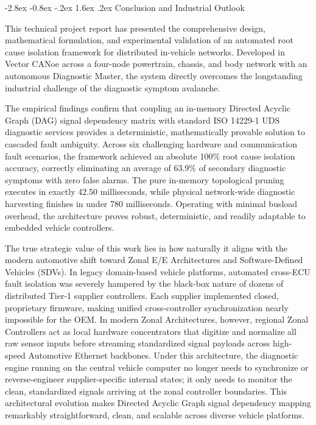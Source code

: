 \documentclass[11pt,a4paper]{article}
\makeatletter
\renewcommand{\section}{\@startsection{section}{1}{\z@}%
  {-2.8ex \@plus -0.8ex \@minus -.2ex}%
  {1.6ex \@plus.2ex}%
  {\normalfont\large\bfseries\color{tatablue}}}
\makeatother
\begin{document}
\section{Conclusion and Industrial Outlook}

This technical project report has presented the comprehensive design, mathematical formulation, and experimental validation of an automated root cause isolation framework for distributed in-vehicle networks. Developed in Vector CANoe across a four-node powertrain, chassis, and body network with an autonomous Diagnostic Master, the system directly overcomes the longstanding industrial challenge of the diagnostic symptom avalanche. 

The empirical findings confirm that coupling an in-memory Directed Acyclic Graph (DAG) signal dependency matrix with standard ISO 14229-1 UDS diagnostic services provides a deterministic, mathematically provable solution to cascaded fault ambiguity. Across six challenging hardware and communication fault scenarios, the framework achieved an absolute 100\% root cause isolation accuracy, correctly eliminating an average of 63.9\% of secondary diagnostic symptoms with zero false alarms. The pure in-memory topological pruning executes in exactly 42.50 milliseconds, while physical network-wide diagnostic harvesting finishes in under 780 milliseconds. Operating with minimal busload overhead, the architecture proves robust, deterministic, and readily adaptable to embedded vehicle controllers.

The true strategic value of this work lies in how naturally it aligns with the modern automotive shift toward Zonal E/E Architectures and Software-Defined Vehicles (SDVs). In legacy domain-based vehicle platforms, automated cross-ECU fault isolation was severely hampered by the black-box nature of dozens of distributed Tier-1 supplier controllers. Each supplier implemented closed, proprietary firmware, making unified cross-controller synchronization nearly impossible for the OEM. In modern Zonal Architectures, however, regional Zonal Controllers act as local hardware concentrators that digitize and normalize all raw sensor inputs before streaming standardized signal payloads across high-speed Automotive Ethernet backbones. Under this architecture, the diagnostic engine running on the central vehicle computer no longer needs to synchronize or reverse-engineer supplier-specific internal states; it only needs to monitor the clean, standardized signals arriving at the zonal controller boundaries. This architectural evolution makes Directed Acyclic Graph signal dependency mapping remarkably straightforward, clean, and scalable across diverse vehicle platforms.
\end{document}
